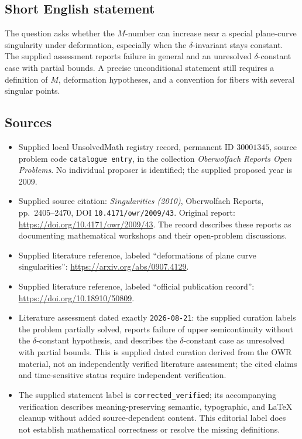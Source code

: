 \documentclass[11pt]{article}
\begin{document}
\subsection{Short English statement}
The question asks whether the \(M\)-number can increase near a special plane-curve singularity under deformation, especially when the \(\delta\)-invariant stays constant. The supplied assessment reports failure in general and an unresolved \(\delta\)-constant case with partial bounds. A precise unconditional statement still requires a definition of \(M\), deformation hypotheses, and a convention for fibers with several singular points.
\subsection{Sources}
\begin{itemize}
\item Supplied local UnsolvedMath registry record, permanent ID \(30001345\), source problem code \texttt{catalogue entry}, in the collection \emph{Oberwolfach Reports Open Problems}. No individual proposer is identified; the supplied proposed year is 2009.
\item Supplied source citation: \emph{Singularities (2010)}, Oberwolfach Reports, pp.\ 2405--2470, DOI \texttt{10.4171/owr/2009/43}. Original report: \url{https://doi.org/10.4171/owr/2009/43}. The record describes these reports as documenting mathematical workshops and their open-problem discussions.
\item Supplied literature reference, labeled ``deformations of plane curve singularities'': \url{https://arxiv.org/abs/0907.4129}.
\item Supplied literature reference, labeled ``official publication record'': \url{https://doi.org/10.18910/50809}.
\item Literature assessment dated exactly \texttt{2026-08-21}: the supplied curation labels the problem partially solved, reports failure of upper semicontinuity without the \(\delta\)-constant hypothesis, and describes the \(\delta\)-constant case as unresolved with partial bounds. This is supplied dated curation derived from the OWR material, not an independently verified literature assessment; the cited claims and time-sensitive status require independent verification.
\item The supplied statement label is \texttt{corrected\_verified}; its accompanying verification describes meaning-preserving semantic, typographic, and LaTeX cleanup without added source-dependent content. This editorial label does not establish mathematical correctness or resolve the missing definitions.
\end{itemize}
\end{document}
